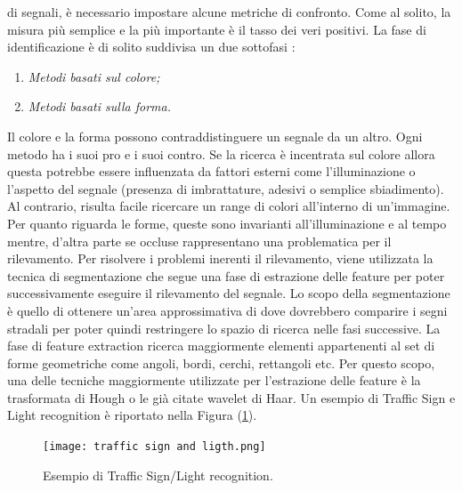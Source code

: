 di segnali, è necessario impostare alcune metriche di confronto. Come al 
solito, la misura più semplice e la più importante è il tasso dei veri positivi.
La fase di identificazione è di solito suddivisa un due sottofasi \cite{sign-rec}:
\begin{enumerate}
    \item \emph{Metodi basati sul colore;}
    \item \emph{Metodi basati sulla forma.}
\end{enumerate}
Il colore e la forma possono contraddistinguere un segnale da un altro.
Ogni metodo ha i suoi pro e i suoi contro. Se la ricerca è incentrata sul 
colore allora questa potrebbe essere influenzata da fattori esterni come 
l'illuminazione o l'aspetto del segnale (presenza di imbrattature, adesivi 
o semplice sbiadimento). Al contrario, risulta facile ricercare un range di 
colori all'interno di un'immagine. Per quanto riguarda le forme, queste 
sono invarianti all'illuminazione e al tempo mentre, d'altra parte se occluse 
rappresentano una problematica per il rilevamento. Per risolvere i problemi 
inerenti il rilevamento, viene utilizzata la tecnica di segmentazione che segue 
una fase di estrazione delle feature per poter successivamente eseguire il 
rilevamento del segnale. Lo scopo della segmentazione è quello di ottenere 
un'area approssimativa di dove dovrebbero comparire i segni stradali per 
poter quindi restringere lo spazio di ricerca nelle fasi successive. La fase 
di feature extraction ricerca maggiormente elementi appartenenti al set di 
forme geometriche come angoli, bordi, cerchi, rettangoli etc. Per questo 
scopo, una delle tecniche maggiormente utilizzate per l'estrazione delle 
feature è la trasformata di Hough o le già citate wavelet di Haar. Un 
esempio di Traffic Sign e Light recognition è riportato nella Figura (\ref{traffic sing-ligth}).
\begin{figure}
    \centering
    \texttt{[image: traffic sign and ligth.png]}
    \centering
    \caption{Esempio di Traffic Sign/Light recognition.}
    \label{traffic sing-ligth}
\end{figure}

